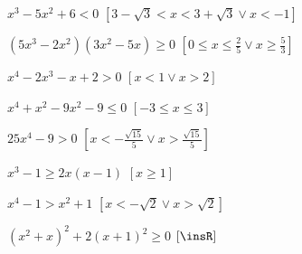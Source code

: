 \begin{esercizio}[\Ast]
\begin{enumeratea}
\item $x^3-5x^2+6<0$ \hfill $\left[3-\sqrt 3<x<3+\sqrt 3\vee x<-1\right]$
\item $\left(5x^3-2x^2\right)\left(3x^2-5x\right)\ge 0$ 
 \hfill $\left[0\le x\le \frac 2 5\vee x\ge \frac 5 3\right]$
\item $x^4-2x^3-x+2>0$ \hfill $\left[x<1\vee x>2\right]$
\item $x^4+x^2-9x^2-9\le 0$ \hfill $\left[-3\le x\le 3\right]$
\item $25x^4-9>0$ 
 \hfill $\left[x<-\frac{\sqrt{15}} 5\vee x>\frac{\sqrt{15}} 5\right]$
\item $x^3-1\ge 2x(x-1)$ \hfill $\left[x\ge 1\right]$
\item $x^4-1>x^2+1$ \hfill $\left[x<-\sqrt 2\vee x>\sqrt 2\right]$
\item $\left(x^2+x\right)^2+2\left(x+1\right)^2\ge 0$ 
 \hfill $\left[\insR\right]$
\end{enumeratea}
\end{esercizio}
% 
% 
